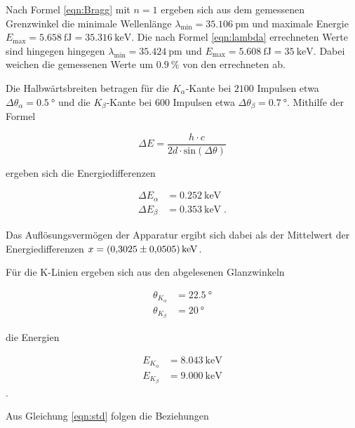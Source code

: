 Nach Formel \eqref{eqn:Bragg} mit $n = 1$ ergeben sich aus dem gemessenen Grenzwinkel die 
minimale Wellenlänge $\lambda_\text{min} = \SI{35.106}{\pico\meter}$ und maximale
Energie $E_\text{max} = \SI{5.658}{\femto\joule} = \SI{35.316}{\kilo\eV}$.
Die nach Formel \eqref{eqn:lambda} errechneten Werte sind hingegen hingegen
$\lambda_\text{min} = \SI{35.424}{\pico\meter}$ und 
$E_\text{max} = \SI{5.608}{\femto\joule} = \SI{35}{\kilo\eV}$.
Dabei weichen die gemessenen Werte um $\SI{0.9}{\percent}$ von den errechneten ab.

Die Halbwärtsbreiten betragen für die $K_\alpha$-Kante bei $2100$ Impulsen
etwa $\Delta \theta_\alpha = \SI{0.5}{\degree}$ und die $K_\beta$-Kante bei $600$ Impulsen
etwa $\Delta \theta_\beta = \SI{0.7}{\degree}$.
Mithilfe der Formel

\begin{equation}
  \Delta E = \frac{h \cdot c}{2d \cdot \text{sin}\left(\Delta \theta \right)}
\end{equation}

ergeben sich die Energiedifferenzen 

\begin{align*}
  \Delta E_\alpha &= \SI{0.252}{\kilo\eV} \\
  \Delta E_\beta &= \SI{0.353}{\kilo\eV}  \; .
\end{align*}

Das Auflösungsvermögen der Apparatur ergibt sich dabei als der Mittelwert der 
Energiedifferenzen $ x = \SI{0.3025 +- 0.0505}{\kilo\eV}$.

Für die K-Linien ergeben sich aus den abgelesenen Glanzwinkeln 

\begin{align*}
  \theta_{K_\alpha} &= \SI{22.5}{\degree} \\
  \theta_{K_\beta} &= \SI{20}{\degree}
\end{align*}

die Energien 

\begin{align*}
E_{K_\alpha} &= \SI{8.043}{\kilo\eV} \\
E_{K_\beta} &= \SI{9.000}{\kilo\eV} 
\end{align*}.

Aus Gleichung \eqref{eqn:std} folgen die Beziehungen


